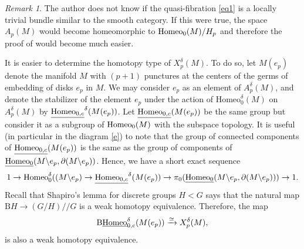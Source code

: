 \documentclass[a4paper]{amsart}
\theoremstyle{definition}
\theoremstyle{remark}
\newtheorem{rem}[thm]{Remark}
\newcommand{\hcoker}{/\!\!/}
\newcommand{\tH}{\text{\textnormal{Homeo}}}
\newcommand{\tdH}{\text{Homeo}^{\delta}}
\newcommand{\BdwH}{\mathrm{B}\underline{\text{\textnormal{Homeo}}}^{\delta}}
\numberwithin{equation}{section}
\begin{document}
\begin{rem}
The author does not know if the quasi-fibration \ref{eq1} is a locally trivial bundle similar to the smooth category. If this were true, the space $A_p(M)$ would become homeomorphic to $\tH_0(M)/H_p$ and therefore the proof of  would become much easier. 
\end{rem}

It is easier to determine the homotopy type of $X^{\delta}_p(M)$.  To do so, let $M(e_p)$ denote the manifold $M$ with  $(p+1)$ punctures at the centers of the germs of embedding of disks $e_p$ in $M$. We may consider $e_p$ as an element of $A_p^{\delta}(M)$, and denote the stabilizer of the element $e_p$ under the action of $\tdH_0(M)$ on $A_p^{\delta}(M)$ by $\underline{\tH_{0,c}}^{\delta}(M(e_p))$.  Let   $\underline{\tH_{0,c}}(M(e_p))$ be the same group but consider it as a subgroup of $\tH_0(M)$ with the subspace topology. It is useful (in particular in the diagram \ref{e}) to note that the group of connected components of $\underline{\tH_{0,c}}(M(e_p))$ is the same as the group of components of $\underline{\tH_{0}}(M\backslash e_p,\partial(M\backslash e_p))$. Hence, we have a short exact sequence
\begin{equation}\label{connectedcomponent}1\to \tdH_0((M\backslash e_p)\to \underline{\tH_{0,c}}^{\delta}(M(e_p))\to \pi_0(\underline{\tH_{0}}(M\backslash e_p,\partial(M\backslash e_p)))\to 1.
\end{equation}
Recall that  Shapiro's lemma for discrete groups $H<G$ says that the natural map $\mathrm{B}H\to (G/H)\hcoker G$ is a weak homotopy equivalence. Therefore, the map 
\begin{equation}\label{eq3}
 \BdwH_{0,c}(M(e_p))\xrightarrow{\simeq}X^{\delta}_p(M),
\end{equation}
is also a weak homotopy equivalence.
\end{document}
